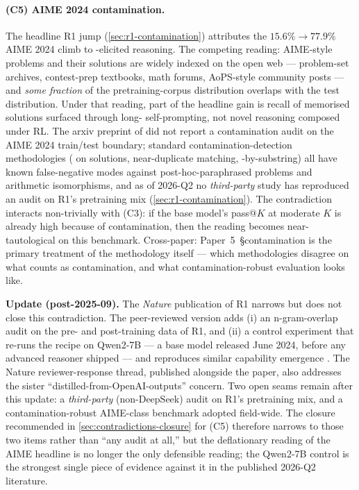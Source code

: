 \paragraph{(C5) AIME 2024 contamination.}
The headline R1 jump (\cref{sec:r1-contamination}) attributes the
$15.6\%\!\to\!77.9\%$ AIME 2024 climb to -elicited reasoning. The
competing reading: AIME-style problems and their solutions are widely
indexed on the open web --- problem-set archives, contest-prep
textbooks, math forums, AoPS-style community posts --- and \emph{some
fraction} of the pretraining-corpus distribution overlaps with the
test distribution. Under that reading, part of the headline gain is
recall of memorised solutions surfaced through long- self-prompting,
not novel reasoning composed under RL. The arxiv preprint of
\citet{deepseek-r1} did not report a contamination audit on the AIME
2024 train/test boundary; standard contamination-detection
methodologies ( on solutions, near-duplicate matching,
-by-substring) all have known false-negative modes
against post-hoc-paraphrased problems and arithmetic isomorphisms, and
as of 2026-Q2 no \emph{third-party} study has reproduced an audit on
R1's pretraining mix (\cref{sec:r1-contamination}). The contradiction
interacts non-trivially with (C3): if the base model's pass@$K$ at
moderate $K$ is already high because of contamination, then the
\citeauthor{rlvr-limits-2025} reading becomes near-tautological on
this benchmark. Cross-paper: Paper~5~\S contamination is the
primary treatment of the methodology  itself --- which
methodologies disagree on what counts as contamination, and what
contamination-robust evaluation looks like.

\textbf{Update (post-2025-09).} The \emph{Nature} publication of R1
\citep{deepseek-r1-nature-2025} narrows but does not close this
contradiction. The peer-reviewed version adds (i) an n-gram-overlap
 audit on the pre- and post-training data of R1, and
(ii) a control experiment that re-runs the  recipe on Qwen2-7B ---
a base model released June 2024, before any advanced reasoner shipped
--- and reproduces similar capability emergence
\citep{deepseek-r1-nature-2025}. The Nature reviewer-response thread,
published alongside the paper, also addresses the sister
``distilled-from-OpenAI-outputs'' concern. Two open seams remain after
this update: a \emph{third-party} (non-DeepSeek) audit on R1's
pretraining mix, and a contamination-robust AIME-class benchmark
adopted field-wide. The closure recommended in
\cref{sec:contradictions-closure} for (C5) therefore narrows to those
two items rather than ``any audit at all,'' but the deflationary
reading of the AIME headline is no longer the only defensible reading; the
Qwen2-7B control is the strongest single piece of evidence against it
in the published 2026-Q2 literature.

